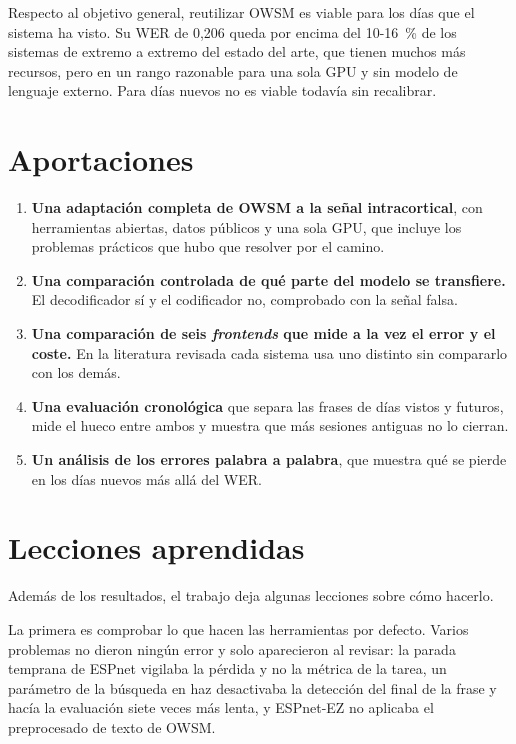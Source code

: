 Respecto al objetivo general, reutilizar OWSM es viable para los días que el sistema ha visto. Su WER de 0,206 queda por encima del 10-16~\% de los sistemas de extremo a extremo del estado del arte, que tienen muchos más recursos, pero en un rango razonable para una sola GPU y sin modelo de lenguaje externo. Para días nuevos no es viable todavía sin recalibrar.

\section{Aportaciones}

\begin{enumerate}[leftmargin=*, itemsep=0.35em]
  \item \textbf{Una adaptación completa de OWSM a la señal intracortical}, con herramientas abiertas, datos públicos y una sola GPU, que incluye los problemas prácticos que hubo que resolver por el camino.
  \item \textbf{Una comparación controlada de qué parte del modelo se transfiere.} El decodificador sí y el codificador no, comprobado con la señal falsa.
  \item \textbf{Una comparación de seis \textit{frontends} que mide a la vez el error y el coste.} En la literatura revisada cada sistema usa uno distinto sin compararlo con los demás.
  \item \textbf{Una evaluación cronológica} que separa las frases de días vistos y futuros, mide el hueco entre ambos y muestra que más sesiones antiguas no lo cierran.
  \item \textbf{Un análisis de los errores palabra a palabra}, que muestra qué se pierde en los días nuevos más allá del WER.
\end{enumerate}

\section{Lecciones aprendidas}

Además de los resultados, el trabajo deja algunas lecciones sobre cómo hacerlo.

La primera es comprobar lo que hacen las herramientas por defecto. Varios problemas no dieron ningún error y solo aparecieron al revisar: la parada temprana de ESPnet vigilaba la pérdida y no la métrica de la tarea, un parámetro de la búsqueda en haz desactivaba la detección del final de la frase y hacía la evaluación siete veces más lenta, y ESPnet-EZ no aplicaba el preprocesado de texto de OWSM.

